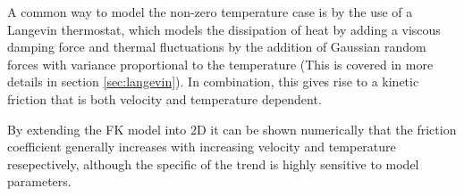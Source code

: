 
A common way to model the non-zero temperature case is by the use of a Langevin
thermostat, which models the dissipation of heat by adding a viscous damping
force and thermal fluctuations by the addition of Gaussian random forces with
variance proportional to the temperature (This is covered in more details in
section \cref{sec:langevin}). In combination, this gives rise to a kinetic
friction that is both velocity and temperature dependent. 

By extending the FK model into 2D \cite{FK2D} it can be shown numerically that
the friction coefficient generally increases with increasing velocity and
temperature resepectively, although the specific of the trend is highly
sensitive to model parameters. 

















